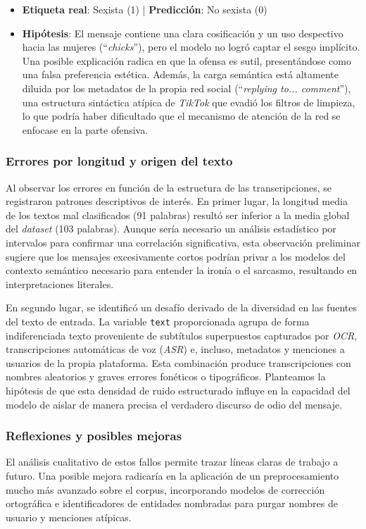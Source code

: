 \begin{itemize}
\begin{itemize}
        \item \textbf{Etiqueta real}: Sexista (1) | \textbf{Predicción}: No sexista (0)
        \item \textbf{Hipótesis}: El mensaje contiene una clara cosificación y un uso despectivo hacia las mujeres (``\textit{chicks}''), pero el modelo no logró captar el sesgo implícito. Una posible explicación radica en que la ofensa es sutil, presentándose como una falsa preferencia estética. Además, la carga semántica está altamente diluida por los metadatos de la propia red social (``\textit{replying to... comment}''), una estructura sintáctica atípica de \textit{TikTok} que evadió los filtros de limpieza, lo que podría haber dificultado que el mecanismo de atención de la red se enfocase en la parte ofensiva.
    \end{itemize}
\end{itemize}

\subsubsection*{Errores por longitud y origen del texto}
\label{subsubsec:ErroresPorLongitudYOrigenDelTexto}
Al observar los errores en función de la estructura de las transcripciones, se registraron patrones descriptivos de interés. En primer lugar, la longitud media de los textos mal clasificados (91 palabras) resultó ser inferior a la media global del \textit{dataset} (103 palabras). Aunque sería necesario un análisis estadístico por intervalos para confirmar una correlación significativa, esta observación preliminar sugiere que los mensajes excesivamente cortos podrían privar a los modelos del contexto semántico necesario para entender la ironía o el sarcasmo, resultando en interpretaciones literales.

En segundo lugar, se identificó un desafío derivado de la diversidad en las fuentes del texto de entrada. La variable \texttt{text} proporcionada agrupa de forma indiferenciada texto proveniente de subtítulos superpuestos capturados por \textit{OCR}, transcripciones automáticas de voz (\textit{ASR}) e, incluso, metadatos y menciones a usuarios de la propia plataforma. Esta combinación produce transcripciones con nombres aleatorios y graves errores fonéticos o tipográficos. Planteamos la hipótesis de que esta densidad de ruido estructurado influye en la capacidad del modelo de aislar de manera precisa el verdadero discurso de odio del mensaje.

\subsubsection*{Reflexiones y posibles mejoras}
\label{subsubsec:ReflexionesYPosiblesMejoras}
El análisis cualitativo de estos fallos permite trazar líneas claras de trabajo a futuro. Una posible mejora radicaría en la aplicación de un preprocesamiento mucho más avanzado sobre el corpus, incorporando modelos de corrección ortográfica e identificadores de entidades nombradas para purgar nombres de usuario y menciones atípicas. 


